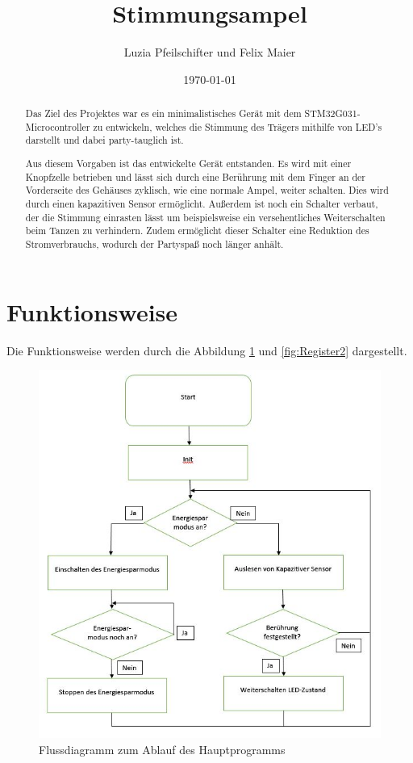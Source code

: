 \documentclass[a4paper,
DIV=13,
12pt,
BCOR=10mm,
department=FakEI,
parskip=half,
automark,
]{article}
\date{\today}
\title{Stimmungsampel}
\author{Luzia Pfeilschifter und Felix Maier}
\begin{document}
\maketitle
\cleardoublepage
\begin{abstract}
Das Ziel des Projektes war es ein minimalistisches Gerät mit dem STM32G031-Microcontroller zu entwickeln, welches die Stimmung des Trägers mithilfe von LED's darstellt und dabei party-tauglich ist. 

Aus diesem Vorgaben ist das entwickelte Gerät entstanden. Es wird mit einer Knopfzelle betrieben und lässt sich durch eine Berührung mit dem Finger an der Vorderseite des Gehäuses zyklisch, wie eine normale Ampel, weiter schalten. Dies wird durch einen kapazitiven Sensor ermöglicht. Außerdem ist noch ein Schalter verbaut, der die \glqq Stimmung\grqq{} einrasten lässt um beispielsweise ein versehentliches Weiterschalten beim Tanzen zu verhindern. Zudem ermöglicht dieser Schalter eine Reduktion des Stromverbrauchs, wodurch der Partyspaß noch länger anhält.
\end{abstract}
\cleardoublepage
\tableofcontents

\cleardoublepage
\section{Funktionsweise}

Die Funktionsweise werden durch die Abbildung \ref{fig:Register1} und \ref{fig:Register2} dargestellt. 

\begin{figure}[!hbpt]
 \begin{center} \includegraphics[width=1.1\textwidth]{AblaufMain.jpg}
 \caption{Flussdiagramm zum Ablauf des Hauptprogramms}
 \label{fig:Register1}
  \end{center}
\end{figure}
\end{document}
